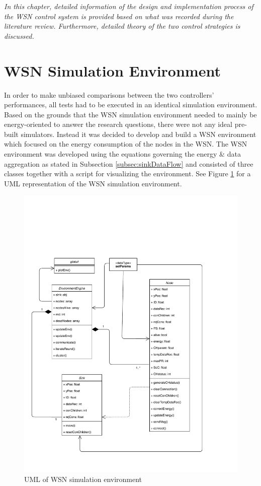 \textit{In this chapter, detailed information of the design and implementation process of the WSN control system is provided based on what was recorded during the literature review. Furthermore, detailed theory of the two control strategies is discussed.}

\section{WSN Simulation Environment}
 In order to make unbiased comparisons between the two controllers' performances, all tests had to be executed in an identical simulation environment. Based on the grounds that the WSN simulation environment needed to mainly be energy-oriented to answer the research questions, there were not any ideal pre-built simulators. Instead it was decided to develop and build a WSN environment which focused on the energy consumption of the nodes in the WSN. The WSN environment was developed using the equations governing the energy \& data aggregation as stated in Subsection \ref{subsec:sinkDataFlow} and consisted of three classes together with a script for visualizing the environment. See Figure \ref{fig:WSNUML} for a UML representation of the WSN simulation environment. 

\begin{figure}
    \centering
    \includegraphics[scale=.7]{Images/WSNUML.pdf}
    \caption{UML of WSN simulation environment}
    \label{fig:WSNUML}
\end{figure}

